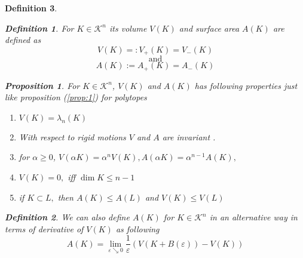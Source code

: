 \documentclass[oneside]{book}
\newtheorem{mydef}{Definition}
\newtheorem{prop}{Proposition}
\begin{document}
\begin{mydef}
 \begin{mydef} \label{d:16}
 For $K \in \mathcal{K}^n$ its volume $V(K) $ and surface area $A(K)$ are defined as 
\[
  V(K) =: V_{+}(K)=V_{-}(K)
\]
$$\text{and} $$
\[
 A(K) :=  A_{+}(K) = A_{-}(K) 
\]
 
\end{mydef}
 \begin{prop}
 
For $ K \in \mathcal{K}^n $,  $V(K) $ and $A(K) $ has following properties just like proposition (\ref{prop:1}) for polytopes
\begin{enumerate}
    \item  $V(K)=\lambda_{n}(K)$
\item With respect to rigid motions $V$ and $A$ are invariant .
\item  for $\alpha \geq 0$, $V(\alpha K)=\alpha^{n} V(K), A(\alpha K)=\alpha^{n-1} A(K),$ 
\item $V(K)=0,$ iff $\operatorname{dim} K \leq n-1$
\item if $K \subset L,$ then  $A(K) \leq A(L)$ and $V(K) \leq V(L)$
\end{enumerate}
 \end{prop}
\begin{mydef} \label{d:17}
We can also define $A(K)$ for $K \in \mathcal{K}^n$ in an alternative way in terms of derivative of $V(K)$ as following \\
\begin{equation}
\label{eq48}
A(K)=\lim _{\varepsilon \searrow 0} \frac{1}{\varepsilon}(V(K+B(\varepsilon))-V(K))
\end{equation}
\end{mydef}



\end{mydef}
\end{document}
